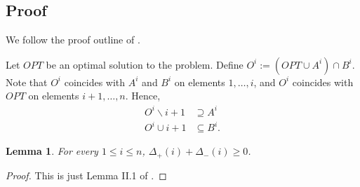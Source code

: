 \documentclass{article} %
\newtheorem{lem}[thm]{Lemma}
\begin{document}
\subsection{Proof}
We follow the proof outline of \cite{buchbinder2012}.

Let $OPT$ be an optimal solution to the problem.
Define $O^i := (OPT \cup A^i) \cap B^i$.
Note that $O^i$ coincides with $A^i$ and $B^i$ on elements $1,\dots,i$, and $O^i$ coincides with $OPT$ on elements $i+1,\dots, n$.
Hence,
\begin{align*}
O^i \backslash i+1 &\supseteq A^i\\
O^i \cup i+1 &\subseteq B^i.
\end{align*}

\begin{lem}\label{lem:positivesum} For every $1 \leq i \leq n$, $\Delta_+(i) + \Delta_-(i) \geq 0$.
\end{lem}
\begin{proof} This is just Lemma II.1 of \cite{buchbinder2012}.
\end{proof}
\end{document}
